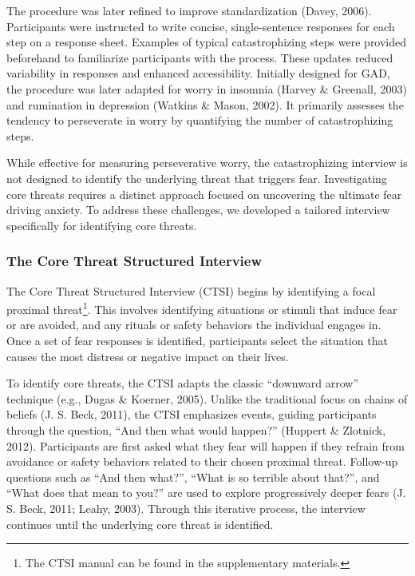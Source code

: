 \documentclass[
  man,floatsintext]{apa7}
\begin{document}
The procedure was later refined to improve standardization (Davey, 2006).
Participants were instructed to write concise, single-sentence responses for each step on a response sheet.
Examples of typical catastrophizing steps were provided beforehand to familiarize participants with the process.
These updates reduced variability in responses and enhanced accessibility.
Initially designed for GAD, the procedure was later adapted for worry in insomnia (Harvey \& Greenall, 2003) and rumination in depression (Watkins \& Mason, 2002).
It primarily assesses the tendency to perseverate in worry by quantifying the number of catastrophizing steps.

While effective for measuring perseverative worry, the catastrophizing interview is not designed to identify the underlying threat that triggers fear.
Investigating core threats requires a distinct approach focused on uncovering the ultimate fear driving anxiety.
To address these challenges, we developed a tailored interview specifically for identifying core threats.

\subsubsection{The Core Threat Structured Interview}\label{the-core-threat-structured-interview}

The Core Threat Structured Interview (CTSI) begins by identifying a focal proximal threat\footnote{The CTSI manual can be found in the supplementary materials.}.
This involves identifying situations or stimuli that induce fear or are avoided, and any rituals or safety behaviors the individual engages in.
Once a set of fear responses is identified, participants select the situation that causes the most distress or negative impact on their lives.

To identify core threats, the CTSI adapts the classic ``downward arrow'' technique (e.g., Dugas \& Koerner, 2005).
Unlike the traditional focus on chains of beliefs (J. S. Beck, 2011), the CTSI emphasizes events, guiding participants through the question, ``And then what would happen?'' (Huppert \& Zlotnick, 2012).
Participants are first asked what they fear will happen if they refrain from avoidance or safety behaviors related to their chosen proximal threat.
Follow-up questions such as ``And then what?'', ``What is so terrible about that?'', and ``What does that mean to you?'' are used to explore progressively deeper fears (J. S. Beck, 2011; Leahy, 2003).
Through this iterative process, the interview continues until the underlying core threat is identified.
\end{document}
